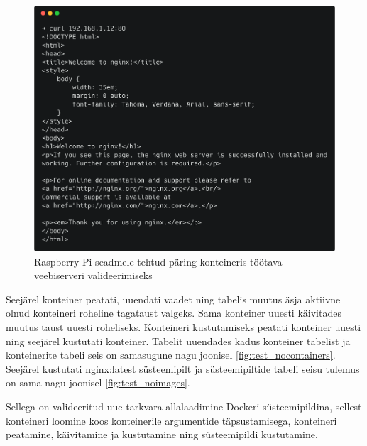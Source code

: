 \documentclass[12pt]{article}
\begin{document}
  \begin{figure} [ht] %
  \begin{center}
  \includegraphics[width=1.0\textwidth]{test_curlactive}
  \caption{Raspberry Pi seadmele tehtud päring konteineris töötava veebiserveri valideerimiseks}
  \label{fig:test_curlactive}
  \end{center}
  \end{figure}
 
  \FloatBarrier
 
  Seejärel konteiner peatati, uuendati vaadet ning tabelis muutus äsja aktiivne olnud konteineri
  roheline tagataust valgeks. Sama konteiner uuesti käivitades muutus taust uuesti roheliseks.
  Konteineri kustutamiseks peatati konteiner uuesti ning seejärel kustutati konteiner. Tabelit
  uuendades kadus konteiner tabelist ja konteinerite tabeli seis on samasugune nagu joonisel \ref{fig:test_nocontainers}.
  Seejärel kustutati nginx:latest süsteemipilt ja süsteemipiltide tabeli seisu tulemus on sama nagu
  joonisel \ref{fig:test_noimages}.
 
  Sellega on valideeritud uue tarkvara allalaadimine Dockeri süsteemipildina, sellest konteineri loomine
  koos konteinerile argumentide täpsustamisega, konteineri peatamine, käivitamine ja kustutamine ning
  süsteemipildi kustutamine.
 
 
  
  
  
  
 
 
 
\end{document}
